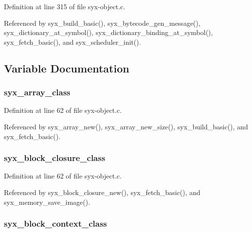 Definition at line 315 of file syx-object.c.

Referenced by syx\_\-build\_\-basic(), syx\_\-bytecode\_\-gen\_\-message(), syx\_\-dictionary\_\-at\_\-symbol(), syx\_\-dictionary\_\-binding\_\-at\_\-symbol(), syx\_\-fetch\_\-basic(), and syx\_\-scheduler\_\-init().

\subsection{Variable Documentation}
\hypertarget{syx-object_8c_ea3c80e36d52b2e7d2988a3e862673cb}{
\subsubsection{ {\bf syx\_\-array\_\-class}}}
\label{syx-object_8c_ea3c80e36d52b2e7d2988a3e862673cb}




Definition at line 62 of file syx-object.c.

Referenced by syx\_\-array\_\-new(), syx\_\-array\_\-new\_\-size(), syx\_\-build\_\-basic(), and syx\_\-fetch\_\-basic().\hypertarget{syx-object_8c_fd7f46b7f1e4ade8fa8b0583e53191e4}{
\subsubsection{ {\bf syx\_\-block\_\-closure\_\-class}}}
\label{syx-object_8c_fd7f46b7f1e4ade8fa8b0583e53191e4}




Definition at line 62 of file syx-object.c.

Referenced by syx\_\-block\_\-closure\_\-new(), syx\_\-fetch\_\-basic(), and syx\_\-memory\_\-save\_\-image().\hypertarget{syx-object_8c_10eccfc9fce175592c0b2a43953da5e3}{
\subsubsection{ {\bf syx\_\-block\_\-context\_\-class}}}
\label{syx-object_8c_10eccfc9fce175592c0b2a43953da5e3}




